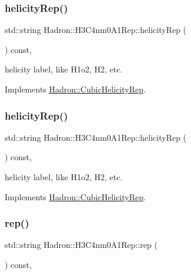 \subsubsection{\texorpdfstring{helicityRep()}{helicityRep()}\hspace{0.1cm}{\footnotesize\ttfamily [2/3]}}
{\footnotesize\ttfamily std\+::string Hadron\+::\+H3\+C4nm0\+A1\+Rep\+::helicity\+Rep (\begin{DoxyParamCaption}{ }\end{DoxyParamCaption}) const\hspace{0.3cm}{\ttfamily [inline]}, {\ttfamily [virtual]}}

helicity label, like H1o2, H2, etc. 

Implements \mbox{\hyperlink{structHadron_1_1CubicHelicityRep_af1096946b7470edf0a55451cc662f231}{Hadron\+::\+Cubic\+Helicity\+Rep}}.

\mbox{\label{structHadron_1_1H3C4nm0A1Rep_a09ac0cfc6730bea0401124a20d15bb0f}} 
\subsubsection{\texorpdfstring{helicityRep()}{helicityRep()}\hspace{0.1cm}{\footnotesize\ttfamily [3/3]}}
{\footnotesize\ttfamily std\+::string Hadron\+::\+H3\+C4nm0\+A1\+Rep\+::helicity\+Rep (\begin{DoxyParamCaption}{ }\end{DoxyParamCaption}) const\hspace{0.3cm}{\ttfamily [inline]}, {\ttfamily [virtual]}}

helicity label, like H1o2, H2, etc. 

Implements \mbox{\hyperlink{structHadron_1_1CubicHelicityRep_af1096946b7470edf0a55451cc662f231}{Hadron\+::\+Cubic\+Helicity\+Rep}}.

\mbox{\label{structHadron_1_1H3C4nm0A1Rep_a3634b28d2dcd2a2aab44846494b1f39c}} 
\subsubsection{\texorpdfstring{rep()}{rep()}\hspace{0.1cm}{\footnotesize\ttfamily [1/5]}}
{\footnotesize\ttfamily std\+::string Hadron\+::\+H3\+C4nm0\+A1\+Rep\+::rep (\begin{DoxyParamCaption}{ }\end{DoxyParamCaption}) const\hspace{0.3cm}{\ttfamily [inline]}, {\ttfamily [virtual]}}



